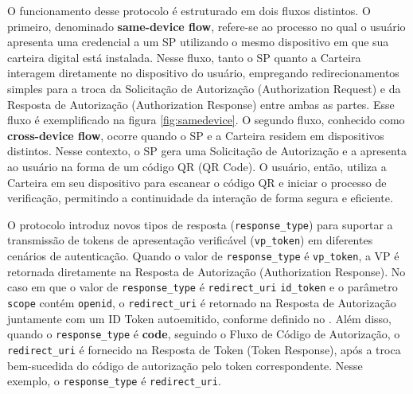 O funcionamento desse protocolo é estruturado em dois fluxos distintos. O primeiro, denominado \textbf{same-device flow}, refere-se ao processo no qual o usuário apresenta uma credencial a um \acs{SP} utilizando o mesmo dispositivo em que sua carteira digital está instalada. Nesse fluxo, tanto o \acs{SP} quanto a Carteira interagem diretamente no dispositivo do usuário, empregando redirecionamentos simples para a troca da Solicitação de Autorização (Authorization Request) e da Resposta de Autorização (Authorization Response) entre ambas as partes. Esse fluxo é exemplificado na figura \autoref{fig:samedevice}. O segundo fluxo, conhecido como \textbf{cross-device flow}, ocorre quando o \acs{SP} e a Carteira residem em dispositivos distintos. Nesse contexto, o \acs{SP} gera uma Solicitação de Autorização e a apresenta ao usuário na forma de um código QR (QR Code). O usuário, então, utiliza a Carteira em seu dispositivo para escanear o código QR e iniciar o processo de verificação, permitindo a continuidade da interação de forma segura e eficiente.

O protocolo introduz novos tipos de resposta (\texttt{response\_type}) para suportar a transmissão de tokens de apresentação verificável (\texttt{vp\_token}) em diferentes cenários de autenticação. Quando o valor de \texttt{response\_type} é \texttt{vp\_token}, a \acs{VP} é retornada diretamente na Resposta de Autorização (Authorization Response). No caso em que o valor de \texttt{response\_type} é \texttt{redirect\_uri} \texttt{id\_token} e o parâmetro \texttt{scope} contém \texttt{openid}, o \texttt{redirect\_uri} é retornado na Resposta de Autorização juntamente com um ID Token autoemitido, conforme definido no \cite{SIOPv2023}. Além disso, quando o \texttt{response\_type} é \textbf{code}, seguindo o Fluxo de Código de Autorização, o \texttt{redirect\_uri} é fornecido na Resposta de Token (Token Response), após a troca bem-sucedida do código de autorização pelo token correspondente. Nesse exemplo, o \texttt{response\_type} é \texttt{redirect\_uri}.



